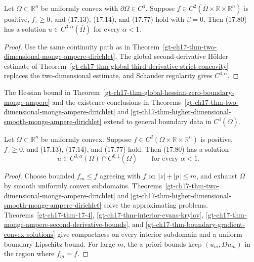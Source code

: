 \begin{theorem}
\label{gt-ch17-thm-higher-dimensional-smooth-monge-ampere-dirichlet}
Let $\Omega\subset\mathbb R^n$ be uniformly convex with
$\partial\Omega\in C^4$.  Suppose
$f\in C^2(\overline\Omega\times\mathbb R\times\mathbb R^n)$ is positive,
$f_z\ge0$, and (17.13), (17.14), and (17.77) hold with $\beta=0$.
Then (17.80) has a solution $u\in C^{3,\alpha}(\overline\Omega)$ for every
$\alpha<1$.
\end{theorem}
\begin{proof}
\sketch Use the same continuity path as in
Theorem~\ref{gt-ch17-thm-two-dimensional-monge-ampere-dirichlet}.  The global
second-derivative H\"older estimate of
Theorem~\ref{gt-ch17-thm-global-third-derivative-strict-concavity} replaces the
two-dimensional estimate, and Schauder regularity gives $C^{3,\alpha}$.
\end{proof}

The Hessian bound in
Theorem~\ref{gt-ch17-thm-global-hessian-zero-boundary-monge-ampere} and the
existence conclusions in
Theorems~\ref{gt-ch17-thm-two-dimensional-monge-ampere-dirichlet} and
\ref{gt-ch17-thm-higher-dimensional-smooth-monge-ampere-dirichlet} extend to
general boundary data in $C^4(\overline\Omega)$.

\begin{theorem}
\label{gt-ch17-thm-interior-smooth-monge-ampere-dirichlet}
Let $\Omega\subset\mathbb R^n$ be uniformly convex.  Suppose
$f\in C^2(\Omega\times\mathbb R\times\mathbb R^n)$ is positive,
$f_z\ge0$, and (17.13), (17.14), and (17.77) hold.  Then (17.80) has a
solution
\[
u\in C^{3,\alpha}(\Omega)\cap C^{0,1}(\overline\Omega)
\qquad\text{for every }\alpha<1.
\]
\end{theorem}
\begin{proof}
\sketch Choose bounded $f_m\le f$ agreeing with $f$ on
$|z|+|p|\le m$, and exhaust $\Omega$ by smooth uniformly convex subdomains.
Theorems~\ref{gt-ch17-thm-two-dimensional-monge-ampere-dirichlet} and
\ref{gt-ch17-thm-higher-dimensional-smooth-monge-ampere-dirichlet} solve the
approximating problems.  Theorems~\ref{gt-ch17-thm-17-4},
\ref{gt-ch17-thm-interior-evans-krylov},
\ref{gt-ch17-thm-monge-ampere-second-derivative-bounds}, and
\ref{gt-ch17-thm-boundary-gradient-convex-solutions} give compactness on
every interior subdomain and a
uniform boundary Lipschitz bound.  For large $m$, the a priori bounds keep
$(u_m,Du_m)$ in the region where $f_m=f$.
\end{proof}

